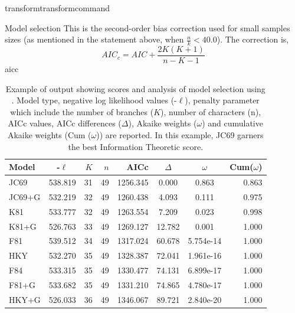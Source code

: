 \begin{command}{transform}{transformcommand}
\begin{arguments}
\begin {argumentgroup}{Model selection}
                        {This is the second-order bias correction used for small
                        samples sizes (as mentioned in the statement above, when
                        $\frac{n}{k} < 40.0$). The correction is,
                        \begin{equation*}
                            AIC_c = AIC + \frac{2K(K+1)} {n-K-1}
                        \end{equation*}}
                        {aicc}
                                         \begin{table}[t]
                \small
                \caption{Example of \poy output showing scores and analysis of model 
                selection using .  Model type, negative log likelihood 
                values (-$\ell$),  penalty parameter which include the number of branches
                 ($K$), number of characters (n), AICc values, AICc differences (${\Delta}$), 
                Akaike weights (${\omega}$) and cumulative Akaike weights (Cum (${\omega}$)) are reported.
                In this example, JC69 garners the best Information Theoretic score. }
                \label {ModelSelectionReport}
                \begin{center}
                    \begin{tabular}{ l c r r  r  c c  r }
                     \hline
                    Model &-$\ell$ & $K$ & $n$ & AICc   & ${\Delta}$ &${\omega}$ & Cum(${\omega}$)\\
                    \hline
                    JC69  &538.819&31&49&1256.345&  0.000&0.863    &0.863 \\
                    JC69+G&532.219&32&49&1260.438&  4.093&0.111    &0.975 \\
                    K81   &533.777&32&49&1263.554&  7.209&0.023    &0.998 \\
                    K81+G &526.763&33&49&1269.127& 12.782&0.001    &1.000 \\
                    F81   &539.512&34&49&1317.024& 60.678&5.754e-14&1.000 \\
                    HKY   &532.270&35&49&1328.387& 72.041&1.961e-16&1.000 \\
                    F84   &533.315&35&49&1330.477& 74.131&6.899e-17&1.000 \\
                    F81+G &533.682&35&49&1331.210& 74.865&4.780e-17&1.000 \\
                    HKY+G &526.033&36&49&1346.067& 89.721&2.840e-20&1.000 \\

\end{tabular}
\end{center}
\end{table}
\end{argumentgroup}
\end{arguments}
\end{command}
